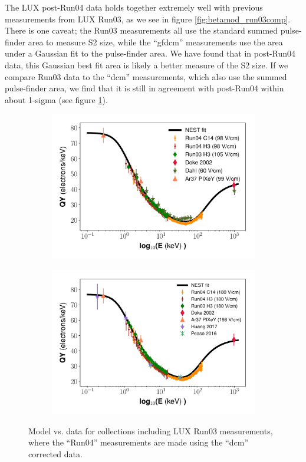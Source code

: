The LUX post-Run04 data holds together extremely well with previous measurements from LUX Run03, as we see in figure \ref{fig:betamod_run03comp}. There is one caveat; the Run03 measurements all use the standard summed pulse-finder area to measure S2 size, while the ``gfdcm'' measurements use the area under a Gaussian fit to the pulse-finder area. We have found that in post-Run04 data, this Gaussian best fit area is likely a better measure of the S2 size. If we compare Run03 data to the ``dcm'' measurements, which also use the summed pulse-finder area, we find that it is still in agreement with post-Run04 within about 1-sigma (see figure \ref{fig:betamod_run03comp_dcm}).
\begin{figure}[!h]
\centering
\begin{subfigure}{0.5\linewidth}
\includegraphics[width=\linewidth]{Figures/Yields_fit_new/NEST_fit_98Vcm_new_dcm.pdf}
\caption{}
\end{subfigure}%
\begin{subfigure}{0.5\linewidth}
\includegraphics[width=\linewidth]{Figures/Yields_fit_new/NEST_fit_180Vcm_new_dcm.pdf}
\caption{}
\end{subfigure}
\caption{Model vs. data for collections including LUX Run03 measurements, where the ``Run04'' measurements are made using the ``dcm'' corrected data.}
\label{fig:betamod_run03comp_dcm}
\end{figure}

